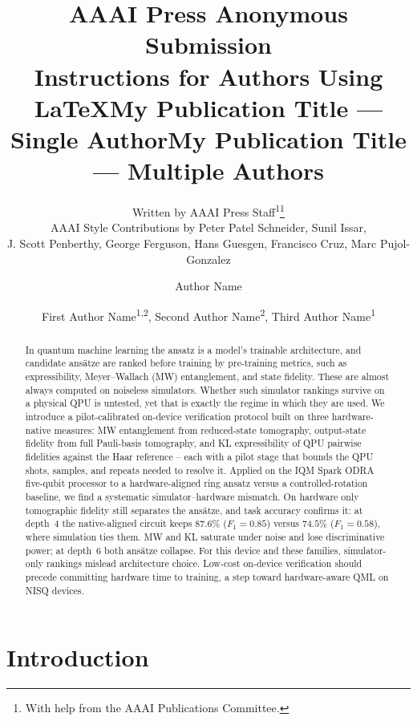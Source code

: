 \documentclass[letterpaper]{article} %
\title{AAAI Press Anonymous Submission\\Instructions for Authors Using \LaTeX{}}
\author{
    Written by AAAI Press Staff\textsuperscript{\rm 1}\thanks{With help from the AAAI Publications Committee.}\\
    AAAI Style Contributions by Peter Patel Schneider,
    Sunil Issar,\\
    J. Scott Penberthy,
    George Ferguson,
    Hans Guesgen,
    Francisco Cruz\equalcontrib\corresponding,
    Marc Pujol-Gonzalez\equalcontrib\corresponding
}
\title{My Publication Title --- Single Author}
\author {
    Author Name
}
\title{My Publication Title --- Multiple Authors}
\author {
    First Author Name\textsuperscript{\rm 1,\rm 2}\equalcontrib,
    Second Author Name\textsuperscript{\rm 2}\equalcontrib,
    Third Author Name\textsuperscript{\rm 1}\corresponding
}
\begin{document}
\maketitle

\begin{abstract}
In quantum machine learning the ansatz is a model's trainable architecture, and candidate ans\"atze are ranked before training by pre-training metrics, such as expressibility, Meyer--Wallach (MW) entanglement, and state fidelity.
These are almost always computed on noiseless simulators.
Whether such simulator rankings survive on a physical QPU is untested, yet that is exactly the regime in which they are used.
We introduce a pilot-calibrated on-device verification protocol built on three hardware-native measures: MW entanglement from reduced-state tomography, output-state fidelity from full Pauli-basis tomography, and KL expressibility of QPU pairwise fidelities against the Haar reference -- each with a pilot stage that bounds the QPU shots, samples, and repeats needed to resolve it.
Applied on the IQM Spark ODRA five-qubit processor to a hardware-aligned ring ansatz versus a controlled-rotation baseline, we find a systematic simulator--hardware mismatch.
On hardware only tomographic fidelity still separates the ans\"atze, and task accuracy confirms it: at depth~4 the native-aligned circuit keeps $87.6\%$ ($F_1 = 0.85$) versus $74.5\%$ ($F_1 = 0.58$), where simulation ties them.
MW and KL saturate under noise and lose discriminative power; at depth~6 both ans\"atze collapse.
For this device and these families, simulator-only rankings mislead architecture choice.
Low-cost on-device verification should precede committing hardware time to training, a step toward hardware-aware QML on NISQ devices.
\end{abstract}


\section{Introduction}
\end{document}
